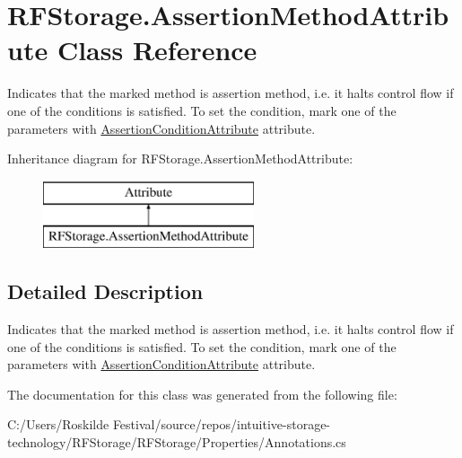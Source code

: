 \hypertarget{class_r_f_storage_1_1_assertion_method_attribute}{}\section{R\+F\+Storage.\+Assertion\+Method\+Attribute Class Reference}
\label{class_r_f_storage_1_1_assertion_method_attribute}


Indicates that the marked method is assertion method, i.\+e. it halts control flow if one of the conditions is satisfied. To set the condition, mark one of the parameters with \mbox{\hyperlink{class_r_f_storage_1_1_assertion_condition_attribute}{Assertion\+Condition\+Attribute}} attribute.  


Inheritance diagram for R\+F\+Storage.\+Assertion\+Method\+Attribute\+:\begin{figure}[H]
\begin{center}
\leavevmode
\includegraphics[height=2.000000cm]{class_r_f_storage_1_1_assertion_method_attribute}
\end{center}
\end{figure}


\subsection{Detailed Description}
Indicates that the marked method is assertion method, i.\+e. it halts control flow if one of the conditions is satisfied. To set the condition, mark one of the parameters with \mbox{\hyperlink{class_r_f_storage_1_1_assertion_condition_attribute}{Assertion\+Condition\+Attribute}} attribute. 



The documentation for this class was generated from the following file\+:\begin{DoxyCompactItemize}
\item 
C\+:/\+Users/\+Roskilde Festival/source/repos/intuitive-\/storage-\/technology/\+R\+F\+Storage/\+R\+F\+Storage/\+Properties/Annotations.\+cs\end{DoxyCompactItemize}
